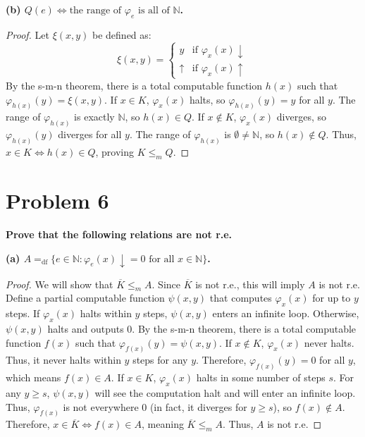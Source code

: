 \documentclass{article}
\begin{document}
\textbf{(b) $Q(e) \iff \text{the range of } \varphi_e \text{ is all of } \mathbb{N}$.}

\begin{proof}
Let $\xi(x, y)$ be defined as:
\[
\xi(x, y) = 
\begin{cases} 
y & \text{if } \varphi_x(x) \downarrow \\
\uparrow & \text{if } \varphi_x(x) \uparrow
\end{cases}
\]
By the s-m-n theorem, there is a total computable function $h(x)$ such that $\varphi_{h(x)}(y) = \xi(x, y)$.
If $x \in K$, $\varphi_x(x)$ halts, so $\varphi_{h(x)}(y) = y$ for all $y$. The range of $\varphi_{h(x)}$ is exactly $\mathbb{N}$, so $h(x) \in Q$.
If $x \notin K$, $\varphi_x(x)$ diverges, so $\varphi_{h(x)}(y)$ diverges for all $y$. The range of $\varphi_{h(x)}$ is $\emptyset \neq \mathbb{N}$, so $h(x) \notin Q$.
Thus, $x \in K \iff h(x) \in Q$, proving $K \leq_m Q$.
\end{proof}

\hrulefill

\section*{Problem 6}
\textbf{Prove that the following relations are not r.e.}

\textbf{(a) $A =_{\text{df}} \{e \in \mathbb{N} : \varphi_e(x)\downarrow = 0 \text{ for all } x \in \mathbb{N}\}$.}

\begin{proof}
We will show that $\overline{K} \leq_m A$. Since $\overline{K}$ is not r.e., this will imply $A$ is not r.e.
Define a partial computable function $\psi(x, y)$ that computes $\varphi_x(x)$ for up to $y$ steps. If $\varphi_x(x)$ halts within $y$ steps, $\psi(x, y)$ enters an infinite loop. Otherwise, $\psi(x, y)$ halts and outputs $0$.
By the s-m-n theorem, there is a total computable function $f(x)$ such that $\varphi_{f(x)}(y) = \psi(x, y)$.
If $x \notin K$, $\varphi_x(x)$ never halts. Thus, it never halts within $y$ steps for any $y$. Therefore, $\varphi_{f(x)}(y) = 0$ for all $y$, which means $f(x) \in A$.
If $x \in K$, $\varphi_x(x)$ halts in some number of steps $s$. For any $y \geq s$, $\psi(x, y)$ will see the computation halt and will enter an infinite loop. Thus, $\varphi_{f(x)}$ is not everywhere $0$ (in fact, it diverges for $y \ge s$), so $f(x) \notin A$.
Therefore, $x \in \overline{K} \iff f(x) \in A$, meaning $\overline{K} \leq_m A$. Thus, $A$ is not r.e.
\end{proof}
\end{document}
